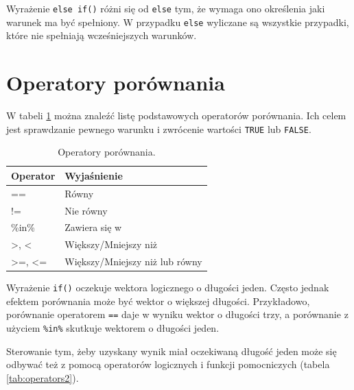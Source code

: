 \documentclass[paper=6in:9in,pagesize=pdftex,headinclude=on,footinclude=on,10pt]{scrbook}
\newenvironment{Shaded}{\begin{snugshade}}{\end{snugshade}}
\newcommand{\CommentTok}[1]{\textcolor[rgb]{0.56,0.35,0.01}{\textit{#1}}}
\newcommand{\DecValTok}[1]{\textcolor[rgb]{0.00,0.00,0.81}{#1}}
\newcommand{\KeywordTok}[1]{\textcolor[rgb]{0.13,0.29,0.53}{\textbf{#1}}}
\newcommand{\NormalTok}[1]{#1}
\newcommand{\OperatorTok}[1]{\textcolor[rgb]{0.81,0.36,0.00}{\textbf{#1}}}
\newcommand{\StringTok}[1]{\textcolor[rgb]{0.31,0.60,0.02}{#1}}
\begin{document}
Wyrażenie \texttt{else\ if()} różni się od \texttt{else} tym, że wymaga ono określenia jaki warunek ma być spełniony.
W przypadku \texttt{else} wyliczane są wszystkie przypadki, które nie spełniają wcześniejszych warunków.

\hypertarget{operatory-poruxf3wnania}{%
\section{Operatory porównania}\label{operatory-poruxf3wnania}}

W tabeli \ref{tab:operators} można znaleźć listę podstawowych operatorów porównania.
Ich celem jest sprawdzanie pewnego warunku i zwrócenie wartości \texttt{TRUE} lub \texttt{FALSE}.

\begin{table}

\caption{\label{tab:operators}Operatory porównania.}
\centering
\begin{tabular}[t]{ll}
\toprule
Operator & Wyjaśnienie\\
\midrule
== & Równy\\
!= & Nie równy\\
\%in\% & Zawiera się w\\
>, < & Większy/Mniejszy niż\\
>=, <= & Większy/Mniejszy niż lub równy\\
\bottomrule
\end{tabular}
\end{table}

Wyrażenie \texttt{if()} oczekuje wektora logicznego o długości jeden.
Często jednak efektem porównania może być wektor o większej długości.
Przykładowo, porównanie operatorem \texttt{==} daje w wyniku wektor o długości trzy, a porównanie z użyciem \texttt{\%in\%} skutkuje wektorem o długości jeden.

\begin{Shaded}
\end{Shaded}

Sterowanie tym, żeby uzyskany wynik miał oczekiwaną długość jeden może się odbywać też z pomocą operatorów logicznych i funkcji pomocniczych (tabela \ref{tab:operators2}).
\end{document}
